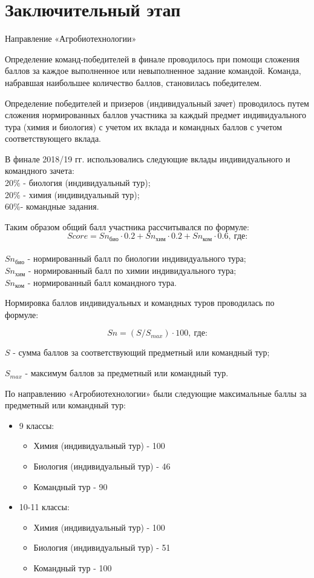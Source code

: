 \section{Заключительный этап}

Направление «Агробиотехнологии»

Определение команд-победителей в финале проводилось при помощи сложения баллов за каждое выполненное или невыполненное задание командой. Команда, набравшая наибольшее количество баллов, становилась победителем.

Определение победителей и призеров (индивидуальный зачет) проводилось путем сложения нормированных баллов участника за каждый предмет индивидуального тура (химия и биология) с учетом их вклада и командных баллов с учетом соответствующего вклада.

В финале 2018/19 гг. использовались следующие вклады индивидуального и командного зачета:\\
20\% - биология (индивидуальный тур); \\
20\% - химия (индивидуальный тур); \\
60\%- командные задания.

Таким образом общий балл участника рассчитывался по формуле:
$$Score = Sn_\text{био} \cdot 0.2 + Sn_\text{хим} \cdot 0.2 + Sn_\text{ком} \cdot 0.6, \: \text{где:}$$\\
$Sn_\text{био}$ - нормированный балл по биологии индивидуального тура;\\
$Sn_\text{хим}$ - нормированный балл по химии индивидуального тура;\\
$Sn_\text{ком}$ - нормированный балл командного тура.

Нормировка баллов индивидуальных и командных туров проводилась по формуле:

$$Sn = (S / S_{max}) \cdot 100, \: \text{где:}$$

$S$ - сумма баллов за соответствующий предметный или командный тур;

$S_{max}$ - максимум баллов за предметный или командный тур.

По направлению «Агробиотехнологии» были следующие максимальные баллы за предметный или командный тур:
\begin{itemize}
    \item 9 классы:
    \begin{itemize}
        \item Химия (индивидуальный тур) - 100 
        \item Биология (индивидуальный тур) - 46
        \item Командный тур - 90
    \end{itemize}
    \item 10-11 классы:
    \begin{itemize}
        \item Химия (индивидуальный тур) - 100
        \item Биология (индивидуальный тур) - 51
        \item Командный тур - 100
    \end{itemize}
\end{itemize}


